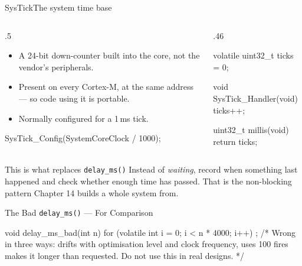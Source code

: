 \documentclass[9pt,aspectratio=169,xcolor=table]{beamer}
\begin{document}
\begin{frame}[fragile]{SysTick}{The system time base}
    \begin{columns}[T]
    \begin{column}{.5\textwidth}
        \begin{itemize}
            \item A \alert{24-bit} down-counter built into the \alert{core}, not
                  the vendor's peripherals.
            \item Present on \alert{every} Cortex-M, at the same address --- so
                  code using it is portable.
            \item Normally configured for a \alert{1\,ms} tick.
        \end{itemize}

        \vspace{2mm}
        {\ttfamily\scriptsize SysTick\_Config(SystemCoreClock / 1000);}
    \end{column}
    \begin{column}{.46\textwidth}
\begin{cc}[basicstyle=\ttfamily\small]
	volatile uint32_t ticks = 0;

	void SysTick_Handler(void)
	{
		ticks++;
	}

	uint32_t millis(void)
	{
		return ticks;
	}
\end{cc}
    \end{column}
    \end{columns}

    \vspace{3mm}
    \begin{block}{This is what replaces \texttt{delay\_ms()}}
        Instead of \emph{waiting}, record when something last happened and check
        whether enough time has passed. That is the \alert{non-blocking} pattern
        Chapter 14 builds a whole system from.
    \end{block}
\end{frame}

\begin{frame}[fragile]{The Bad \texttt{delay\_ms()} --- For Comparison}
\begin{cc}[basicstyle=\ttfamily\small]
		void delay_ms_bad(int n)
		{
			for (volatile int i = 0; i < n * 4000; i++)
			;
			/* Wrong in three ways: drifts with optimisation level
			and clock frequency, uses 100%
			fires makes it longer than requested. Do not use this
			in real designs. */
		}
\end{cc}
\end{frame}
\end{document}
